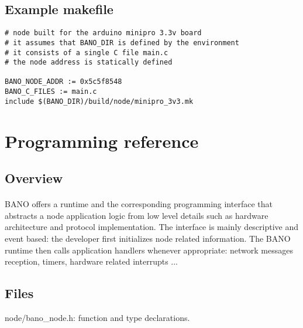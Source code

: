 \documentclass[a4paper, 11pt]{article}
\begin{document}
\subsection{Example makefile}
\begin{scriptsize}
\begin{verbatim}
# node built for the arduino minipro 3.3v board
# it assumes that BANO_DIR is defined by the environment
# it consists of a single C file main.c
# the node address is statically defined

BANO_NODE_ADDR := 0x5c5f8548
BANO_C_FILES := main.c
include $(BANO_DIR)/build/node/minipro_3v3.mk
\end{verbatim}
\end{scriptsize}


\clearpage
\section{Programming reference}

\subsection{Overview}
\paragraph{}
BANO offers a runtime and the corresponding programming interface
that abstracts a node application logic from low level details
such as hardware architecture and protocol implementation. The
interface is mainly descriptive and event based: the developer
first initializes node related information. The BANO runtime then
calls application handlers whenever appropriate: network messages
reception, timers, hardware related interrupts ...

\subsection{Files}
node/bano\_node.h: function and type declarations.
\end{document}
